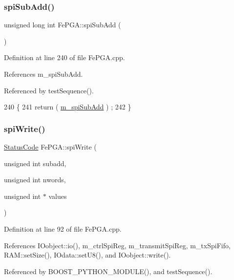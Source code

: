 \subsubsection{\texorpdfstring{spi\+Sub\+Add()}{spiSubAdd()}}
{\footnotesize\ttfamily unsigned long int Fe\+P\+G\+A\+::spi\+Sub\+Add (\begin{DoxyParamCaption}{ }\end{DoxyParamCaption})}



Definition at line 240 of file Fe\+P\+G\+A.\+cpp.



References m\+\_\+spi\+Sub\+Add.



Referenced by test\+Sequence().


\begin{DoxyCode}
240                                   \{
241   \textcolor{keywordflow}{return} ( \hyperlink{classFePGA_a4f2f5d175aeb6dcaf497f81d2f075411}{m\_spiSubAdd} ) ;
242 \}
\end{DoxyCode}
\mbox{\label{classFePGA_ac3e8b10fc267b44fef1e651cab77d2ab}} 
\subsubsection{\texorpdfstring{spi\+Write()}{spiWrite()}\hspace{0.1cm}{\footnotesize\ttfamily [1/3]}}
{\footnotesize\ttfamily \hyperlink{classStatusCode}{Status\+Code} Fe\+P\+G\+A\+::spi\+Write (\begin{DoxyParamCaption}\item[{unsigned int}]{subadd,  }\item[{unsigned int}]{nwords,  }\item[{unsigned int $\ast$}]{values }\end{DoxyParamCaption})}



Definition at line 92 of file Fe\+P\+G\+A.\+cpp.



References I\+Oobject\+::io(), m\+\_\+ctrl\+Spi\+Reg, m\+\_\+transmit\+Spi\+Reg, m\+\_\+tx\+Spi\+Fifo, R\+A\+M\+::set\+Size(), I\+Odata\+::set\+U8(), and I\+Oobject\+::write().



Referenced by B\+O\+O\+S\+T\+\_\+\+P\+Y\+T\+H\+O\+N\+\_\+\+M\+O\+D\+U\+L\+E(), and test\+Sequence().


